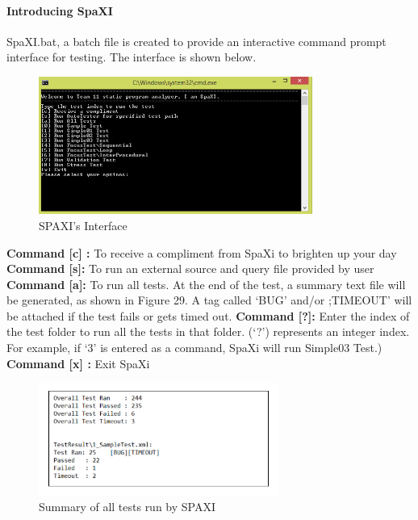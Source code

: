 \documentclass[12pt]{article}
\begin{document}
{{{{{{{{{{{{{ \paragraph{Introducing SpaXI}
 SpaXI.bat, a batch file is created to provide an interactive command prompt interface for testing. The interface is shown below.
 \begin{figure}[H]
\includegraphics[width = 0.8\textwidth]{cmd.png}
\caption{SPAXI's Interface}
\end{figure}
\textbf{Command [c] :} To receive a compliment from SpaXi to brighten up your day \newline
\textbf{Command [s]:} To run an external source and query file provided by user \newline
\textbf{Command [a]:} To run all tests. At the end of the test, a summary text file will be generated, as shown in Figure 29. A tag called ‘BUG’ and/or ;TIMEOUT’ will be attached if the test fails or gets timed out. \newline
\textbf{Command [?]:} Enter the index of the test folder to run all the tests in that folder. (‘?’) represents an integer index. For example, if ‘3’ is entered as a command, SpaXi will run Simple03 Test.) \newline
\textbf{Command [x] :} Exit SpaXi \newline
 \begin{figure}[H]
\includegraphics[width = 0.7\textwidth]{summary.png}
\caption{Summary of all tests run by SPAXI}
\end{figure}
}}}}}}}}}}}}}
\end{document}
